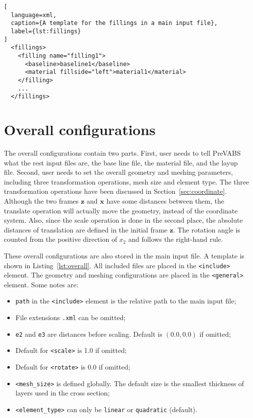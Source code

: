 \documentclass{book}
\begin{document}
\begin{lstlisting}[
  language=xml,
  caption={A template for the fillings in a main input file},
  label={lst:fillings}
]
  <fillings>
    <filling name="filling1">
      <baseline>baseline1</baseline>
      <material fillside="left">material1</material>
    </filling>
    ...
  </fillings>
\end{lstlisting}



\section{Overall configurations}
\label{sec:overall}

The overall configurations contain two parts. First, user needs to tell 
PreVABS what the rest input files are, the base line file, the material 
file, and the layup file. Second, user needs to set the overall geometry 
and meshing parameters, including three transformation operations, mesh 
size and element type. The three transformation operations have been 
discussed in Section~\ref{sec:coordinate}. Although the two frames 
$\mathbf z$ and $\mathbf x$ have some distances between them, the 
translate operation will actually move the geometry, instead of the 
coordinate system. Also, since the scale operation is done in the second 
place, the absolute distances of translation are defined in the initial 
frame $\mathbf z$. The rotation angle is counted from the positive 
direction of $x_2$ and follows the right-hand rule.

These overall configurations are also stored in the main input file. A 
template is shown in Listing~\ref{lst:overall}. All included files are 
placed in the \lstinline{<include>} element. The geometry and meshing 
configurations are placed in the \lstinline{<general>} element. Some 
notes are:
\begin{itemize}
  \item \lstinline{path} in the \lstinline{<include>} element is the 
    relative path to the main input file;
  \item File extensions \lstinline{.xml} can be omitted;
  \item \lstinline{e2} and \lstinline{e3} are distances before scaling. 
    Default is $(0.0, 0.0)$ if omitted;
  \item Default for \lstinline{<scale>} is 1.0 if omitted;
  \item Default for \lstinline{<rotate>} is 0.0 if omitted;
  \item \lstinline{<mesh_size>} is defined globally. The default size 
    is the smallest thickness of layers used in the cross section;
  \item \lstinline{<element_type>} can only be \lstinline{linear} or 
    \lstinline{quadratic} (default).
\end{itemize}
\end{document}
